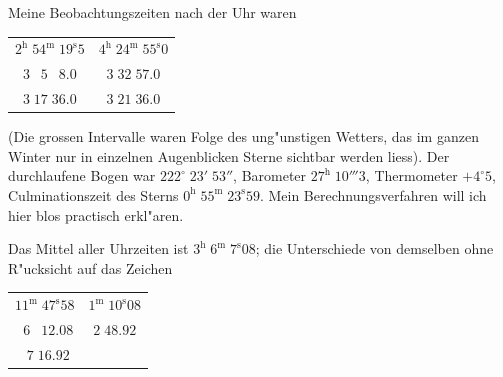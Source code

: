 \documentclass[12pt,a4paper]{article}
\begin{document}
Meine Beobachtungszeiten nach der Uhr waren
\begin{center}
\begin{tabular}{c|c}
$2^{\mathrm{h}}\;54^{\mathrm{m}}\;19^{\mathrm{s}}5$ & $4^{\mathrm{h}}\;24^{\mathrm{m}}\;55^{\mathrm{s}}0$ \\
$3\;\phantom{0}5\;\phantom{0}8.0$ & $3\;32\;57.0$ \\
$3\;17\;36.0$ & $3\;21\;36.0$ \\
\end{tabular}
\end{center}
(Die grossen Intervalle waren Folge des ung"unstigen Wetters, das im ganzen Winter nur in einzelnen
Augenblicken Sterne sichtbar werden liess). Der durchlaufene Bogen war $222^{\circ}\;23'\;53''$, Barometer
$27^{\mathrm{h}}\;10'''3$, Thermometer $+4^{\circ}5$, Culminationszeit des Sterns $0^{\mathrm{h}}\;55^{\mathrm{m}}\;23^{\mathrm{s}}59$.
Mein Berechnungsverfahren will ich hier blos practisch erkl"aren.

Das Mittel aller Uhrzeiten ist $3^{\mathrm{h}}\;6^{\mathrm{m}}\;7^{\mathrm{s}}08$; die Unterschiede von demselben ohne R"ucksicht auf das Zeichen
\begin{center}
\begin{tabular}{c|c}
$11^{\mathrm{m}}\;47^{\mathrm{s}}58$ & $1^{\mathrm{m}}\;10^{\mathrm{s}}08$ \\
$\phantom{0}6\;\phantom{0}12.08$ & $2\;48.92$ \\
$\phantom{0}7\;16.92$ & \\
\end{tabular}
\end{center}
\end{document}
